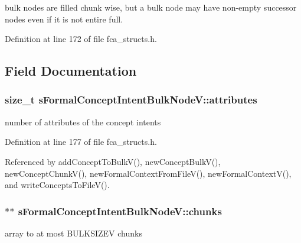 bulk nodes are filled chunk wise, but a bulk node may have non-\/empty successor nodes even if it is not entire full. 

\-Definition at line 172 of file fca\-\_\-structs.\-h.



\subsection{\-Field \-Documentation}
\hypertarget{structsFormalConceptIntentBulkNodeV_a0bcc56cc39eb49a954c136099d6e46e7}{
\subsubsection[{attributes}]{\setlength{\rightskip}{0pt plus 5cm}size\-\_\-t {\bf s\-Formal\-Concept\-Intent\-Bulk\-Node\-V\-::attributes}}}\label{structsFormalConceptIntentBulkNodeV_a0bcc56cc39eb49a954c136099d6e46e7}


number of attributes of the concept intents 



\-Definition at line 177 of file fca\-\_\-structs.\-h.



\-Referenced by add\-Concept\-To\-Bulk\-V(), new\-Concept\-Bulk\-V(), new\-Concept\-Chunk\-V(), new\-Formal\-Context\-From\-File\-V(), new\-Formal\-Context\-V(), and write\-Concepts\-To\-File\-V().

\hypertarget{structsFormalConceptIntentBulkNodeV_a0e2dad46489f048d39181e59eb1c6039}{
\subsubsection[{chunks}]{$\ast$$\ast$ {\bf s\-Formal\-Concept\-Intent\-Bulk\-Node\-V\-::chunks}}}\label{structsFormalConceptIntentBulkNodeV_a0e2dad46489f048d39181e59eb1c6039}


array to at most \-B\-U\-L\-K\-S\-I\-Z\-E\-V chunks 



